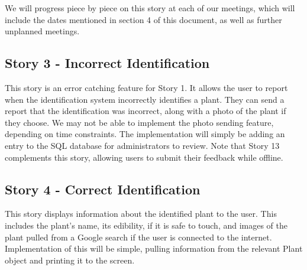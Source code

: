 \documentclass[a4paper]{article}
\begin{document}
We will progress piece by piece on this story at each of our meetings, which will include the dates mentioned in section 4 of this document, as well as further unplanned meetings. 

\subsection{Story 3 - Incorrect Identification}

This story is an error catching feature for Story 1. It allows the user to report when the identification system incorrectly identifies a plant. They can send a report that the identification was incorrect, along with a photo of the plant if they choose. We may not be able to implement the photo sending feature, depending on time constraints. The implementation will simply be adding an entry to the SQL database for administrators to review. Note that Story 13 complements this story, allowing users to submit their feedback while offline. 

\subsection{Story 4 - Correct Identification}

This story displays information about the identified plant to the user. This includes the plant's name, its edibility, if it is safe to touch, and images of the plant pulled from a Google search if the user is connected to the internet. Implementation of this will be simple, pulling information from the relevant Plant object and printing it to the screen.

\pagebreak
\end{document}
